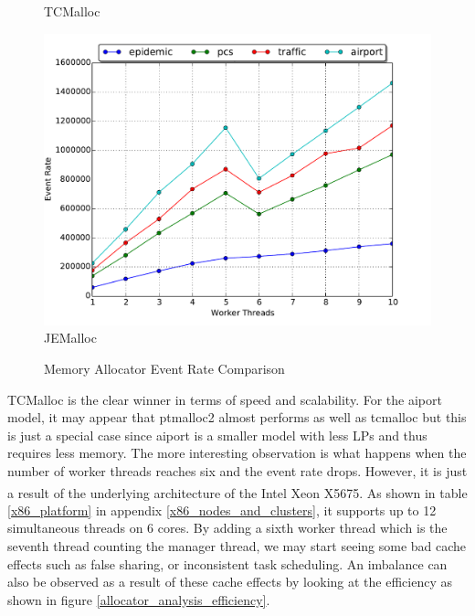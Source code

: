 \documentclass[11pt]{book}
\begin{document}
\begin{figure}
\begin{minipage}{.5\textwidth}
\begin{center}
      TCMalloc \\
    \end{center}
  \end{minipage}
  \centering
  \begin{minipage}{.5\textwidth}
    \begin{center}
      \includegraphics[width=\textwidth,keepaspectratio,quiet]{figs/memory_allocation/jemalloc_eventrate.pdf} \\
      JEMalloc \\
    \end{center}
  \end{minipage}
  \caption{Memory Allocator Event Rate Comparison}\label{allocator_analysis_eventrate}
\end{figure}

TCMalloc is the clear winner in terms of speed and scalability. For the aiport model, it may
appear that ptmalloc2 almost performs as well as tcmalloc but this is just a special case since
aiport is a smaller model with less LPs and thus requires less memory. The more interesting
observation is what happens when the number of worker threads reaches six and the event rate
drops. However, it is just a result of the underlying architecture of the
Intel\textsuperscript{\textregistered} Xeon\textsuperscript{\textregistered} X5675. As shown in
table \ref{x86_platform} in appendix \ref{x86_nodes_and_clusters}, it supports up to 12 simultaneous
threads on 6 cores. By adding a sixth worker thread which is the seventh thread counting the
manager thread, we may start seeing some bad cache effects such as false sharing, or inconsistent
task scheduling. An imbalance can also be observed as a result of these cache effects by looking at
the efficiency as shown in figure \ref{allocator_analysis_efficiency}.
\end{document}

